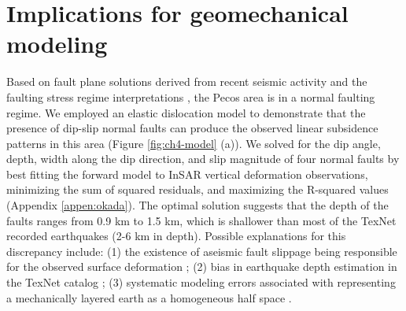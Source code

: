 \section{Implications for geomechanical modeling}
Based on fault plane solutions derived from recent seismic activity and the faulting stress regime interpretations \citep{LundSnee2018StateStressPermian}, the Pecos area is in a normal faulting regime. We employed an elastic dislocation model \citep{Okada1992InternalDeformationDue} to demonstrate that the presence of dip-slip normal faults can produce the observed linear subsidence patterns in this area (Figure \ref{fig:ch4-model} (a)). We solved for the dip angle, depth, width along the dip direction, and slip magnitude of four normal faults by best fitting the forward model to InSAR vertical deformation observations, minimizing the sum of squared residuals, and maximizing the R-squared values \citep{Du1992ComparisonVariousInversion} (Appendix \ref{appen:okada}). The optimal solution suggests that the depth of the faults ranges from 0.9 km to 1.5 km, which is shallower than most of the TexNet recorded earthquakes (2-6 km in depth). Possible explanations for this discrepancy include: (1) the existence of aseismic fault slippage being responsible for the observed surface deformation \citep{McGarr2017WastewaterDisposalEarthquake}; (2) bias in earthquake depth estimation in the TexNet catalog \citep{Lomax2019ImprovingAbsoluteEarthquake}; (3) systematic modeling errors associated with representing a mechanically layered earth as a homogeneous half space \citep{Du1992ComparisonVariousInversion}. 



